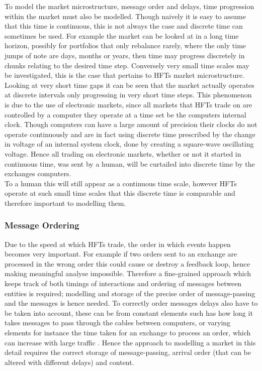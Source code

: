 \documentclass{article}
\begin{document}
To model the market microstructure, message order and delays, time progression within the market must also be modelled. Though naively it is easy to assume that this time is continuous, this is not always the case and discrete time can sometimes be used. For example the market can be looked at in a long time horizon,  possibly for portfolios that only rebalance rarely, where the only time jumps of note are days, months or years, then time may progress discretely in chunks relating to the desired time step. Conversely very small time scales may be investigated, this is the case that pertains to HFTs market microstructure. Looking at very short time gaps it can be seen that the market actually operates at discrete intervals only progressing in very short time steps. This phenomenon is due to the use of electronic markets, since all markets that HFTs trade on are controlled by a computer they operate at a time set be the computers internal clock. Though computers can have a large amount of precision their clocks do not operate continuously and are in fact using discrete time prescribed by the change in voltage of an internal system clock, done by creating a square-wave oscillating voltage. Hence all trading on electronic markets, whether or not it started in continuous time, was sent by a human, will be curtailed into discrete time by the exchanges computers.\\
To a human this will still appear as a continuous time scale, however HFTs operate at such small time scales that this discrete time is comparable and therefore important to modelling them.       

\subsubsection{Message Ordering}

Due to the speed at which HFTs trade, the order in which events happen becomes very important. For example if two orders sent to an exchange are processed in the wrong order this could cause or destroy a feedback loop, hence making meaningful analyse impossible. Therefore a fine-grained approach which keeps track of both timings of interactions and ordering of messages between entities is required; modelling and storage of the precise order of message-passing and the messages is hence needed. To correctly order messages delays also have to be taken into account, these can be from constant elements such has how long it takes messages to pass through the cables between computers, or varying elements for instance the time taken for an exchange to process an order, which can increase with large traffic \cite{SECreport_delays}. Hence the approach to modelling a market in this detail requires the correct storage of message-passing, arrival order (that can be altered with different delays) and content.
\end{document}
